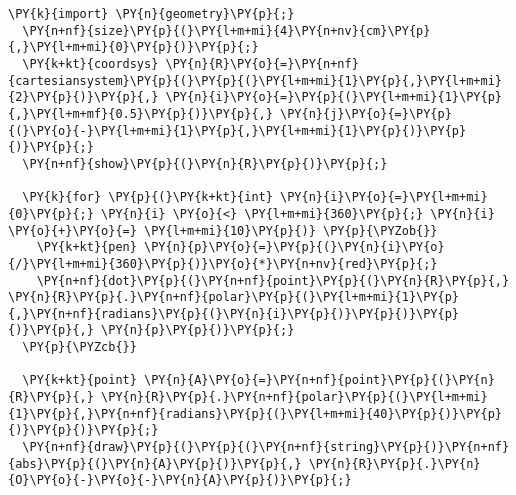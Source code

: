 \begin{Verbatim}[commandchars=\\\{\}]
  \PY{k}{import} \PY{n}{geometry}\PY{p}{;}
  \PY{n+nf}{size}\PY{p}{(}\PY{l+m+mi}{4}\PY{n+nv}{cm}\PY{p}{,}\PY{l+m+mi}{0}\PY{p}{)}\PY{p}{;}
  \PY{k+kt}{coordsys} \PY{n}{R}\PY{o}{=}\PY{n+nf}{cartesiansystem}\PY{p}{(}\PY{p}{(}\PY{l+m+mi}{1}\PY{p}{,}\PY{l+m+mi}{2}\PY{p}{)}\PY{p}{,} \PY{n}{i}\PY{o}{=}\PY{p}{(}\PY{l+m+mi}{1}\PY{p}{,}\PY{l+m+mf}{0.5}\PY{p}{)}\PY{p}{,} \PY{n}{j}\PY{o}{=}\PY{p}{(}\PY{o}{-}\PY{l+m+mi}{1}\PY{p}{,}\PY{l+m+mi}{1}\PY{p}{)}\PY{p}{)}\PY{p}{;}
  \PY{n+nf}{show}\PY{p}{(}\PY{n}{R}\PY{p}{)}\PY{p}{;}

  \PY{k}{for} \PY{p}{(}\PY{k+kt}{int} \PY{n}{i}\PY{o}{=}\PY{l+m+mi}{0}\PY{p}{;} \PY{n}{i} \PY{o}{<} \PY{l+m+mi}{360}\PY{p}{;} \PY{n}{i} \PY{o}{+}\PY{o}{=} \PY{l+m+mi}{10}\PY{p}{)} \PY{p}{\PYZob{}}
    \PY{k+kt}{pen} \PY{n}{p}\PY{o}{=}\PY{p}{(}\PY{n}{i}\PY{o}{/}\PY{l+m+mi}{360}\PY{p}{)}\PY{o}{*}\PY{n+nv}{red}\PY{p}{;}
    \PY{n+nf}{dot}\PY{p}{(}\PY{n+nf}{point}\PY{p}{(}\PY{n}{R}\PY{p}{,} \PY{n}{R}\PY{p}{.}\PY{n+nf}{polar}\PY{p}{(}\PY{l+m+mi}{1}\PY{p}{,}\PY{n+nf}{radians}\PY{p}{(}\PY{n}{i}\PY{p}{)}\PY{p}{)}\PY{p}{)}\PY{p}{,} \PY{n}{p}\PY{p}{)}\PY{p}{;}
  \PY{p}{\PYZcb{}}

  \PY{k+kt}{point} \PY{n}{A}\PY{o}{=}\PY{n+nf}{point}\PY{p}{(}\PY{n}{R}\PY{p}{,} \PY{n}{R}\PY{p}{.}\PY{n+nf}{polar}\PY{p}{(}\PY{l+m+mi}{1}\PY{p}{,}\PY{n+nf}{radians}\PY{p}{(}\PY{l+m+mi}{40}\PY{p}{)}\PY{p}{)}\PY{p}{)}\PY{p}{;}
  \PY{n+nf}{draw}\PY{p}{(}\PY{p}{(}\PY{n+nf}{string}\PY{p}{)}\PY{n+nf}{abs}\PY{p}{(}\PY{n}{A}\PY{p}{)}\PY{p}{,} \PY{n}{R}\PY{p}{.}\PY{n}{O}\PY{o}{-}\PY{o}{-}\PY{n}{A}\PY{p}{)}\PY{p}{;}
\end{Verbatim}
